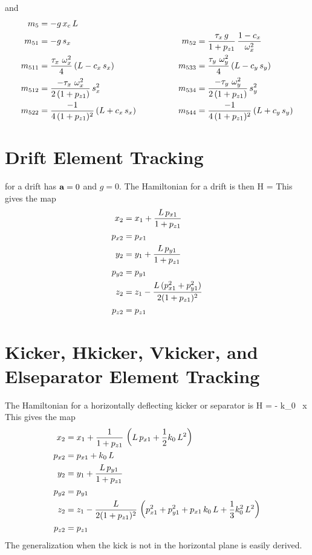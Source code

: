 and
\begin{alignat}{2}
  m_5     &= -g \, x_c \, L & \qquad \qquad & \nonumber \\
  m_{51}  &= -g \, s_x & \qquad \qquad
  m_{52}  &= \frac{\tau_x \, g}{1 + p_{z1}} \, \frac{1 - c_x}{\omega_x^2} \nonumber \\
  m_{511} &= \frac{\tau_x \,\, \omega_x^2}{4} \, (L - c_x \, s_x) & \qquad \qquad
  m_{533} &= \frac{\tau_y \,\, \omega_y^2}{4} \, (L - c_y \, s_y) \nonumber \\
  m_{512} &= \frac{-\tau_x \,\, \omega_x^2}{2 \, (1 + p_{z1})} \, s_x^2 & \qquad \qquad
  m_{534} &= \frac{-\tau_y \,\, \omega_y^2}{2 \, (1 + p_{z1})} \, s_y^2 \nonumber \\
  m_{522} &= \frac{-1}{4 \, (1 + p_{z1})^2} \, (L + c_x \, s_x) & \qquad \qquad
  m_{544} &= \frac{-1}{4 \, (1 + p_{z1})^2} \, (L + c_y \, s_y) \nonumber
\end{alignat}

\section{Drift Element Tracking}
\label{s:drift.std}

 for a drift has ${\bf a} = 0$ and $g = 0$. The Hamiltonian for a
drift is then
\Begineq
  H =  
\Endeq
This gives the map
\begin{align}
  x_2    &= x_1 + \frac{L \, p_{x1}}{1 + p_{z1}} \nonumber \\
  p_{x2} &= p_{x1}  \nonumber \\
  y_2    &= y_1 + \frac{L \, p_{y1}}{1 + p_{z1}} \nonumber \\
  p_{y2} &= p_{y1}  \\
  z_2    &= z_1 - \frac{L \, (p_{x1}^2 + p_{y1}^2)}{2 (1 + p_{z1})^2} \nonumber \\
  p_{z2} &= p_{z1} \nonumber
\end{align}

\section{Kicker, Hkicker, Vkicker, and Elseparator Element Tracking}
\label{s:kicker.std}

The Hamiltonian for a horizontally deflecting kicker or separator is
\Begineq
  H =  - k_0 \, x 
\Endeq
This gives the map
\begin{align}
  x_2    &= x_1 + \frac{1}{1 + p_{z1}} \, \left( L \, p_{x1} + \frac{1}{2} k_0 \, L^2 \right) \nonumber \\
  p_{x2} &= p_{x1} + k_0 \, L \nonumber \\
  y_2    &= y_1 + \frac{L \, p_{y1}}{1 + p_{z1}} \nonumber \\
  p_{y2} &= p_{y1}  \\
  z_2    &= z_1 - \frac{L}{2 (1 + p_{z1})^2} \, 
    \left( p_{x1}^2 + p_{y1}^2 + p_{x1} \, k_0 \, L + \frac{1}{3} k_0^2 \, L^2 \right) \nonumber \\
  p_{z2} &= p_{z1} \nonumber
\end{align}
The generalization when the kick is not in the horizontal plane is easily derived.


